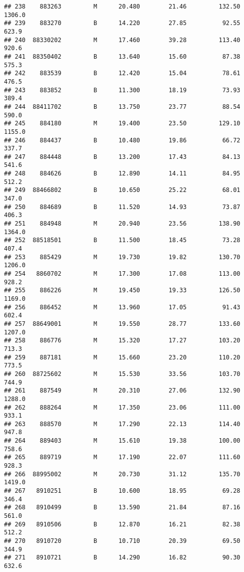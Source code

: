 \documentclass[
]{article}
\begin{document}
\begin{verbatim}
## 238    883263         M      20.480        21.46         132.50    1306.0
## 239    883270         B      14.220        27.85          92.55     623.9
## 240  88330202         M      17.460        39.28         113.40     920.6
## 241  88350402         B      13.640        15.60          87.38     575.3
## 242    883539         B      12.420        15.04          78.61     476.5
## 243    883852         B      11.300        18.19          73.93     389.4
## 244  88411702         B      13.750        23.77          88.54     590.0
## 245    884180         M      19.400        23.50         129.10    1155.0
## 246    884437         B      10.480        19.86          66.72     337.7
## 247    884448         B      13.200        17.43          84.13     541.6
## 248    884626         B      12.890        14.11          84.95     512.2
## 249  88466802         B      10.650        25.22          68.01     347.0
## 250    884689         B      11.520        14.93          73.87     406.3
## 251    884948         M      20.940        23.56         138.90    1364.0
## 252  88518501         B      11.500        18.45          73.28     407.4
## 253    885429         M      19.730        19.82         130.70    1206.0
## 254   8860702         M      17.300        17.08         113.00     928.2
## 255    886226         M      19.450        19.33         126.50    1169.0
## 256    886452         M      13.960        17.05          91.43     602.4
## 257  88649001         M      19.550        28.77         133.60    1207.0
## 258    886776         M      15.320        17.27         103.20     713.3
## 259    887181         M      15.660        23.20         110.20     773.5
## 260  88725602         M      15.530        33.56         103.70     744.9
## 261    887549         M      20.310        27.06         132.90    1288.0
## 262    888264         M      17.350        23.06         111.00     933.1
## 263    888570         M      17.290        22.13         114.40     947.8
## 264    889403         M      15.610        19.38         100.00     758.6
## 265    889719         M      17.190        22.07         111.60     928.3
## 266  88995002         M      20.730        31.12         135.70    1419.0
## 267   8910251         B      10.600        18.95          69.28     346.4
## 268   8910499         B      13.590        21.84          87.16     561.0
## 269   8910506         B      12.870        16.21          82.38     512.2
## 270   8910720         B      10.710        20.39          69.50     344.9
## 271   8910721         B      14.290        16.82          90.30     632.6

\end{verbatim}
\end{document}
